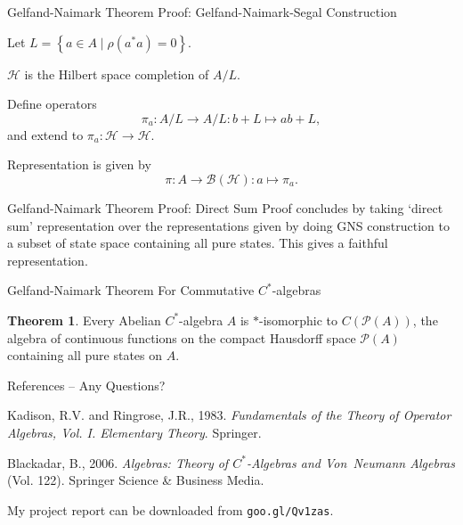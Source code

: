 \documentclass[11pt]{beamer}
\theoremstyle{definition}
\newtheorem{thm}{Theorem}
\renewcommand{\P}[1]{\mathscr{P}(#1)}
\begin{document}
\begin{frame} {Gelfand-Naimark Theorem} {Proof: Gelfand-Naimark-Segal Construction}
	
	Let $L= \left\{a \in A \mid \rho (a^\ast a) = 0 \right\}$.
	
	$\mathcal H $ is the Hilbert space completion of $A / L$.
	
	
	Define operators 
	\[
		\pi_a : A/L \to A/L : b+L \mapsto ab + L,
	\]
	and extend to $\pi_a : \mathcal H \to \mathcal H$.
	
	
	Representation is given by
	\[
		\pi: A \to \mathcal{B(H)} : a \mapsto \pi_a.
	\]
\end{frame}

\begin{frame} {Gelfand-Naimark Theorem} {Proof: Direct Sum}
	Proof concludes by taking `direct sum' representation over the representations 
	given by doing GNS construction to a subset of state space containing all pure 
	states. This gives a faithful representation.
\end{frame}

\begin{frame} {Gelfand-Naimark Theorem} {For Commutative $C^\ast$-algebras}
	\begin{thm}
		Every Abelian $C^\ast$-algebra $A$ is $\ast$-isomorphic to $C(\P A)$, the 
		algebra of continuous functions on the compact Hausdorff space $\P A$ containing 
		all pure states on $A$. 
	\end{thm}
\end{frame}

\begin{frame} {References -- Any Questions?}

	
	Kadison, R.V. and Ringrose, J.R., 1983. 
	\textit{Fundamentals of the Theory of Operator Algebras, Vol. I. Elementary Theory}. 
	Springer.
	
	Blackadar, B., 2006. 
	\textit{Algebras: Theory of $C^\ast$-Algebras and Von~Neumann 
	Algebras} (Vol. 122). 
	Springer Science \& Business Media.

	\vfill

	My project report can be downloaded from \texttt{goo.gl/Qv1zas}.
	
\end{frame}
\end{document}
